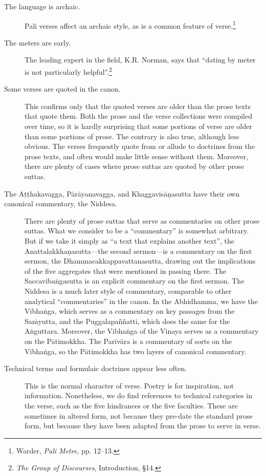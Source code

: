 \documentclass[12pt,openany]{book}%
\begin{document}
\begin{description}%
\item[The language is archaic.] Pali verses affect an archaic style, as is a common feature of verse.\footnote{Warder, \textit{Pali Metre}, pp. 12–13. }%
\item[The meters are early.] The leading expert in the field, K.R. Norman, says that “dating by meter is not particularly helpful”.\footnote{\textit{The Group of Discourses}, Introduction, §14. }%
\item[Some verses are quoted in the canon.] This confirms only that the quoted verses are older than the prose texts that quote them. Both the prose and the verse collections were compiled over time, so it is hardly surprising that some portions of verse are older than some portions of prose. The contrary is also true, although less obvious. The verses frequently quote from or allude to doctrines from the prose texts, and often would make little sense without them. Moreover, there are plenty of cases where prose suttas are quoted by other prose suttas.%
\item[The \textsanskrit{Aṭṭhakavagga}, \textsanskrit{Pārāyanavagga}, and \textsanskrit{Khaggavisāṇasutta} have their own canonical commentary, the Niddesa.] There are plenty of prose suttas that serve as commentaries on other prose suttas. What we consider to be a “commentary” is somewhat arbitrary. But if we take it simply as “a text that explains another text”, the \textsanskrit{Anattalakkhaṇasutta}—the second sermon—is a commentary on the first sermon, the Dhammacakkappavattanasutta, drawing out the implications of the five aggregates that were mentioned in passing there. The \textsanskrit{Saccavibaṅgasutta} is an explicit commentary on the first sermon. The Niddesa is a much later style of commentary, comparable to other analytical “commentaries” in the canon. In the Abhidhamma, we have the \textsanskrit{Vibhaṅga}, which serves as a commentary on key passages from the \textsanskrit{Saṁyutta}, and the \textsanskrit{Puggalapaññatti}, which does the same for the \textsanskrit{Aṅguttara}. Moreover, the \textsanskrit{Vibhaṅga} of the Vinaya serves as a commentary on the \textsanskrit{Pātimokkha}. The \textsanskrit{Parivāra} is a commentary of sorts on the \textsanskrit{Vibhaṅga}, so the \textsanskrit{Pātimokkha} has two layers of canonical commentary.%
\item[Technical terms and formulaic doctrines appear less often.] This is the normal character of verse. Poetry is for inspiration, not information. Nonetheless, we do find references to technical categories in the verse, such as the five hindrances or the five faculties. These are sometimes in altered form, not because they pre-date the standard prose form, but because they have been adapted from the prose to serve in verse.%

\end{description}
\end{document}
